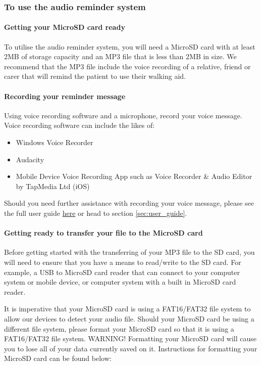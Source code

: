 			\subsubsection{To use the audio reminder system}

				\paragraph{Getting your MicroSD card ready}\mbox{}

				To utilise the audio reminder system, you will need a MicroSD card with at least 2MB of storage capacity and an MP3 file that is less than 2MB in size. We recommend that the MP3 file include the voice recording of a relative, friend or carer that will remind the patient to use their walking aid. 

				\paragraph{Recording your reminder message}\mbox{}

				Using voice recording software and a microphone, record your voice message. Voice recording software can include the likes of:

				\begin{itemize}
					\item Windows Voice Recorder
					\item Audacity
					\item Mobile Device Voice Recording App such as Voice Recorder \& Audio Editor by TapMedia Ltd (iOS)
				\end{itemize}

				Should you need further assistance with recording your voice message, please see the full user guide \hyperref[sec:user_guide]{here} or head to section \ref{sec:user_guide}.

				\paragraph{Getting ready to transfer your file to the MicroSD card}\mbox{}

				Before getting started with the transferring of your MP3 file to the SD card, you will need to ensure that you have a means to read/write to the SD card. For example, a USB to MicroSD card reader that can connect to your computer system or mobile device, or computer system with a built in MicroSD card reader.

				It is imperative that your MicroSD card is using a FAT16/FAT32 file system to allow our devices to detect your audio file. Should your MicroSD card be using a different file system, please format your MicroSD card so that it is using a FAT16/FAT32 file system. WARNING! Formatting your MicroSD card will cause you to lose all of your data currently saved on it. Instructions for formatting your MicroSD card can be found below:

